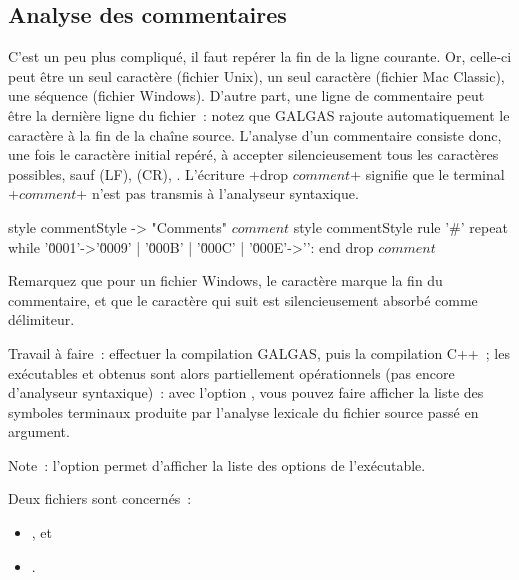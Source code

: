 \subsection{Analyse des commentaires}
C'est un peu plus compliqué, il faut repérer la fin de la ligne courante. Or, celle-ci peut être un seul caractère  (fichier Unix), un seul caractère  (fichier Mac Classic), une séquence  (fichier Windows). D'autre part, une ligne de commentaire peut être la dernière ligne du fichier~: notez que GALGAS rajoute automatiquement le caractère \tpp{\textquotesingle\textbackslash 0\textquotesingle} à la fin de la chaîne source. L'analyse d'un commentaire consiste donc, une fois le caractère initial \tpp{\textquotesingle\textbackslash\#\textquotesingle} repéré, à accepter silencieusement tous les caractères possibles, sauf  (LF),  (CR), . L’écriture \ggsq+drop $comment$+ signifie que le terminal \ggsq+$comment$+ n’est pas transmis à l’analyseur syntaxique.

\begin{galgas4}
style commentStyle -> "Comments"
$comment$ style commentStyle %
rule '#' {
  repeat
  while '\u0001'->'\u0009' | '\u000B' | '\u000C' | '\u000E'->'\uFFFD':
  end
  drop $comment$
}
\end{galgas4}

Remarquez que pour un fichier Windows, le caractère  marque la fin du commentaire, et que le caractère  qui suit est silencieusement absorbé comme délimiteur.

Travail à faire~: effectuer la compilation GALGAS, puis la compilation C++~; les exécutables  et  obtenus sont alors partiellement opérationnels (pas encore d’analyseur syntaxique)~: avec l'option , vous pouvez faire afficher la liste des symboles terminaux produite par l'analyse lexicale du fichier source passé en argument.

Note~: l'option  permet d'afficher la liste des options de l'exécutable.


Deux fichiers sont concernés~:
\begin{itemize}
  \item {}, et
  \item {}.
\end{itemize}

